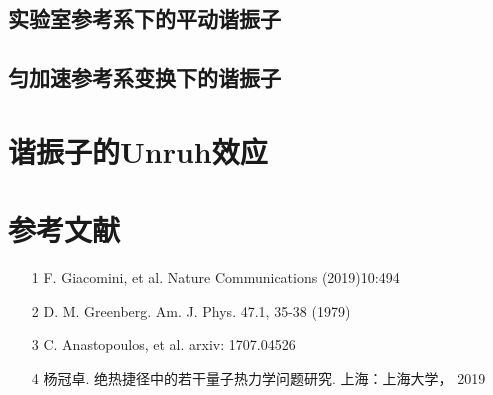 \documentclass[a4paper]{article}
\begin{document}
    \subsection{实验室参考系下的平动谐振子}

    \subsection{匀加速参考系变换下的谐振子}

    \section{谐振子的Unruh效应}


    \section*{参考文献}
    \begin{itemize}
        \item[1] F. Giacomini, et al. Nature Communications (2019)10:494
        \item[2] D. M. Greenberg. Am. J. Phys. 47.1, 35-38 (1979)
        \item[3] C. Anastopoulos, et al. arxiv: 1707.04526
        \item[4] 杨冠卓. 绝热捷径中的若干量子热力学问题研究. 上海：上海大学， 2019
    \end{itemize}
\end{document}
